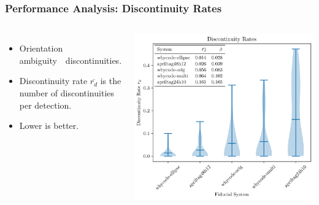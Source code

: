 \documentclass[aspectratio=169]{rubeamer}
\newcommand{\nologo}{\setbeamertemplate{logo}{}}
\begin{document}
\begin{frame}
\begin{tabular}{m{}m{}}
  \end{tabular}
\end{frame}

\nologo
\begin{frame}
  \frametitle{Performance Analysis: Discontinuity Rates}
  \begin{columns}
      \centering
      \begin{itemize}
        \item Orientation ambiguity~\textrightarrow~discontinuities.
        \item Discontinuity rate $\overline{r_d}$ is the number of discontinuities per detection.
        \item Lower is better.
      \end{itemize}
      \centering
      \includegraphics[width=\textwidth]{violin_plot_five_member}
  \end{columns}
\end{frame}
\end{document}
